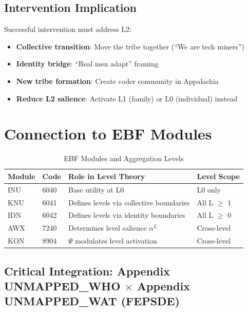 \subsection{Intervention Implication}

Successful intervention must address L2:
\begin{itemize}
\item \textbf{Collective transition}: Move the tribe together (``We are tech miners'')
\item \textbf{Identity bridge}: ``Real men adapt'' framing
\item \textbf{New tribe formation}: Create coder community in Appalachia
\item \textbf{Reduce L2 salience}: Activate L1 (family) or L0 (individual) instead
\end{itemize}

\section{Connection to EBF Modules}
\label{sec:aaa-bcm-connection}

\begin{table}[htbp]
\centering
\caption{EBF Modules and Aggregation Levels}
\label{tab:aaa-bcm-modules}
\renewcommand{\arraystretch}{1.4}
\begin{tabular}{@{}llll@{}}
\toprule
\textbf{Module} & \textbf{Code} & \textbf{Role in Level Theory} & \textbf{Level Scope} \\
\midrule
INU & 6040 & Base utility at L0 & L0 only \\
KNU & 6041 & Defines levels via collective boundaries & All L $\geq$ 1 \\
IDN & 6042 & Defines levels via identity boundaries & All L $\geq$ 0 \\
AWX & 7240 & Determines level salience $\alpha^L$ & Cross-level \\
KON & 8904 & $\Psi$ modulates level activation & Cross-level \\
\bottomrule
\end{tabular}
\end{table}

\subsection{Critical Integration: Appendix UNMAPPED_WHO $\times$ Appendix UNMAPPED_WAT (FEPSDE)}
\label{subsec:aaa-c-integration}

